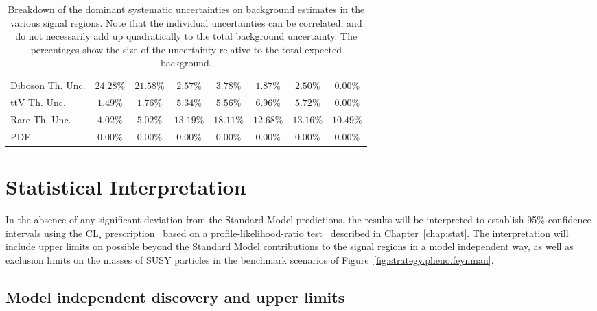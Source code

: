 \begin{table}[htb!]
\begin{center}
{\begin{tabular}{|l|c|c|c|c|c|c|c|}
        \hline
        Diboson Th. Unc.    &    $24.28 \%$    &   $21.58 \%$    &    $2.57 \%$    &    $3.78 \%$    &    $1.87 \%$    &    $2.50 \%$       &    $0.00 \%$     \\
        ttV Th. Unc.    &    $1.49 \%$    &   $1.76 \%$    &    $5.34 \%$    &    $5.56 \%$    &    $6.96 \%$    &    $5.72 \%$       &    $0.00 \%$     \\
        Rare Th. Unc.    &    $4.02 \%$    &   $5.02 \%$    &    $13.19 \%$    &    $18.11 \%$    &    $12.68 \%$    &    $13.16 \%$       &    $10.49 \%$     \\
        PDF    &    $0.00 \%$    &   $0.00 \%$    &    $0.00 \%$    &    $0.00 \%$    &    $0.00 \%$    &    $0.00 \%$       &    $0.00 \%$     \\
\hline 
\end{tabular}}

\vspace*{0.5cm}

\vspace*{-0.01\textheight}\caption{Breakdown of the dominant systematic uncertainties on background estimates in the various signal regions.
Note that the individual uncertainties can be correlated, and do not necessarily add up quadratically to 
the total background uncertainty. The percentages show the size of the uncertainty relative to the total expected background.}
\label{tab:res.sys.break}
\end{center}
\end{table}




\section{Statistical Interpretation}

In the absence of any significant deviation from the Standard Model predictions,
the results will be interpreted to 
 establish 95\% confidence intervals using the CL$_\mathrm{s}$ prescription~\cite{Read:2002hq} 
based on a profile-likelihood-ratio test~\cite{Cowan:2010js}
 described in Chapter~\ref{chap:stat}.
The interpretation will include upper limits on possible beyond the Standard Model contributions to the signal 
regions in a model independent way,
as well as exclusion limits on the masses of 
SUSY particles in the benchmark scenarios of Figure~\ref{fig:strategy.pheno.feynman}. 

\subsection{Model independent discovery and upper limits}

